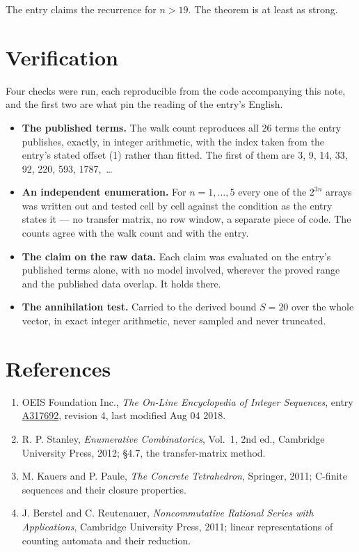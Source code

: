 \documentclass[11pt]{article}
\theoremstyle{definition}
\begin{document}
The entry claims the recurrence for $n > 19$. The theorem is at least as strong.

\section{Verification}

Four checks were run, each reproducible from the code accompanying this note, and the first two are what pin the reading of the entry's English.

\begin{itemize}

\item {\bfseries The published terms.} The walk count reproduces all 26 terms the entry publishes, exactly, in integer arithmetic, with the index taken from the entry's stated offset (1) rather than fitted. The first of them are 3, 9, 14, 33, 92, 220, 593, 1787,~\dots

\item {\bfseries An independent enumeration.} For $n = 1,\dots,5$ every one of the $2^{3n}$ arrays was written out and tested cell by cell against the condition as the entry states it --- no transfer matrix, no row window, a separate piece of code. The counts agree with the walk count and with the entry.

\item {\bfseries The claim on the raw data.} Each claim was evaluated on the entry's published terms alone, with no model involved, wherever the proved range and the published data overlap. It holds there.

\item {\bfseries The annihilation test.} Carried to the derived bound $S = 20$ over the whole vector, in exact integer arithmetic, never sampled and never truncated.

\end{itemize}

\section{References}

\begin{enumerate}

\item OEIS Foundation Inc., \emph{The On-Line Encyclopedia of Integer Sequences}, entry \href{https://oeis.org/A317692}{A317692}, revision 4, last modified Aug 04 2018.

\item R. P. Stanley, \emph{Enumerative Combinatorics}, Vol.~1, 2nd ed., Cambridge University Press, 2012; \S4.7, the transfer-matrix method.

\item M. Kauers and P. Paule, \emph{The Concrete Tetrahedron}, Springer, 2011; C-finite sequences and their closure properties.

\item J. Berstel and C. Reutenauer, \emph{Noncommutative Rational Series with Applications}, Cambridge University Press, 2011; linear representations of counting automata and their reduction.

\end{enumerate}
\end{document}
